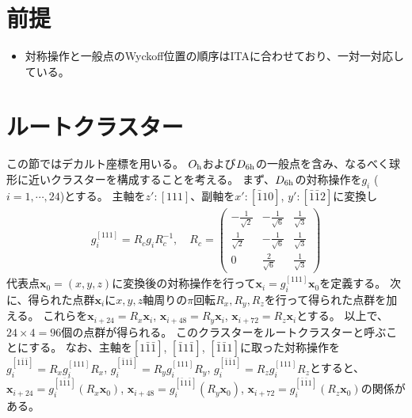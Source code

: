 \documentclass[11pt]{easymemo}
\begin{document}


\section{前提}
\begin{itemize}
\item 対称操作と一般点のWyckoff位置の順序はITAに合わせており、一対一対応している。
\end{itemize}

\section{ルートクラスター}

この節ではデカルト座標を用いる。
$O_{\rm h}$および$D_{\rm 6h}$の一般点を含み、なるべく球形に近いクラスターを構成することを考える。
まず、$D_{\rm 6h}$の対称操作を$g_i$ ($i=1,\cdots,24$)とする。
主軸を$z':[111]$、副軸を$x':[\bar{1}10]$, $y':[\bar{1}\bar{1}2]$に変換し
\begin{align}
g_i^{[111]}=R_cg_iR_c^{-1},
\quad
R_c = \begin{pmatrix}
-\frac{1}{\sqrt{2}} & -\frac{1}{\sqrt{6}} & \frac{1}{\sqrt{3}} \\
\frac{1}{\sqrt{2}} & -\frac{1}{\sqrt{6}} & \frac{1}{\sqrt{3}} \\
0 & \frac{2}{\sqrt{6}} & \frac{1}{\sqrt{3}}
\end{pmatrix}
\end{align}
代表点$\bm{x}_0=(x,y,z)$に変換後の対称操作を行って$\bm{x}_i=g_i^{[111]}\bm{x}_0$を定義する。
次に、得られた点群$\bm{x}_i$に$x,y,z$軸周りの$\pi$回転$R_x,R_y,R_z$を行って得られた点群を加える。
これらを$\bm{x}_{i+24}=R_x\bm{x}_i$, $\bm{x}_{i+48}=R_y\bm{x}_i$, $\bm{x}_{i+72}=R_z\bm{x}_i$とする。
以上で、$24\times 4=96$個の点群が得られる。
このクラスターをルートクラスターと呼ぶことにする。
なお、主軸を$[1\bar{1}\bar{1}]$, $[\bar{1}1\bar{1}]$, $[\bar{1}\bar{1}1]$に取った対称操作を$g_i^{[1\bar{1}\bar{1}]}=R_xg_i^{[111]}R_x$, $g_i^{[\bar{1}1\bar{1}]}=R_yg_i^{[111]}R_y$, $g_i^{[\bar{1}\bar{1}1]}=R_zg_i^{[111]}R_z$とすると、$\bm{x}_{i+24}=g_i^{[1\bar{1}\bar{1}]}(R_x\bm{x}_0)$, $\bm{x}_{i+48}=g_i^{[\bar{1}1\bar{1}]}(R_y\bm{x}_0)$, $\bm{x}_{i+72}=g_i^{[\bar{1}\bar{1}1]}(R_z\bm{x}_0)$の関係がある。
\end{document}
